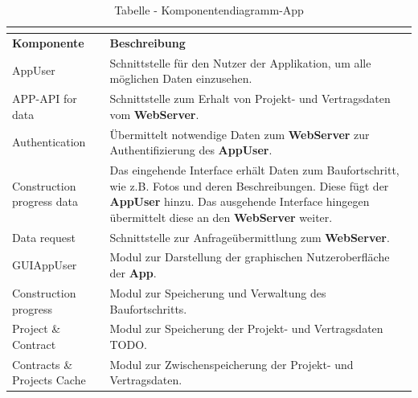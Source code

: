 \begin{longtable}[h]{|p{2.5cm}|p{10.0cm}|}
	\caption{Tabelle - Komponentendiagramm-App}
	\centering
	\label{tab:table_comp_app}
	\endlastfoot
	\hline \multicolumn{2}{|r|}{{Weitergeführt auf der folgenden Seite}} \\ \hline
	\endfoot
	\endhead
	\hline
	\textbf{Komponente} & \textbf{Beschreibung} \\ 
	\hline
	AppUser & Schnittstelle für den Nutzer der Applikation, um alle möglichen Daten einzusehen. \\
	\hline
	APP-API for data & Schnittstelle zum Erhalt von Projekt- und Vertragsdaten vom \textbf{WebServer}. \\
	\hline
	Authentication & Übermittelt notwendige Daten zum \textbf{WebServer} zur Authentifizierung des \textbf{AppUser}. \\
	\hline
	Construction progress data & Das eingehende Interface erhält Daten zum Baufortschritt, wie z.B. Fotos und deren Beschreibungen. Diese fügt der \textbf{AppUser} hinzu. Das ausgehende Interface hingegen übermittelt diese an den \textbf{WebServer} weiter. \\
	\hline
	Data request & Schnittstelle zur Anfrageübermittlung zum \textbf{WebServer}. \\
	\hline
	GUIAppUser & Modul zur Darstellung der graphischen Nutzeroberfläche der \textbf{App}. \\
	\hline
	Construction progress & Modul zur Speicherung und Verwaltung des Baufortschritts. \\
	\hline
	Project {\&} Contract & Modul zur Speicherung der Projekt- und Vertragsdaten TODO. \\
	\hline
	Contracts {\&} Projects Cache & Modul zur Zwischenspeicherung der Projekt- und Vertragsdaten. \\
	\hline
\end{longtable}

\clearpage